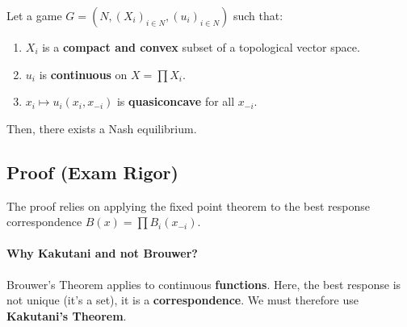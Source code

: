 \begin{theoreme}[Glicksberg]
Let a game $G = (N, (X_i)_{i \in N}, (u_i)_{i \in N})$ such that:
\begin{enumerate}
    \item $X_i$ is a \textbf{compact and convex} subset of a topological vector space.
    \item $u_i$ is \textbf{continuous} on $X = \prod X_i$.
    \item $x_i \mapsto u_i(x_i, x_{-i})$ is \textbf{quasiconcave} for all $x_{-i}$.
\end{enumerate}
Then, there exists a Nash equilibrium.
\end{theoreme}

\subsection{Proof (Exam Rigor)}
The proof relies on applying the fixed point theorem to the best response correspondence $B(x) = \prod B_i(x_{-i})$.

\paragraph{Why Kakutani and not Brouwer?}
Brouwer's Theorem applies to continuous \textbf{functions}. Here, the best response is not unique (it's a set), it is a \textbf{correspondence}. We must therefore use \textbf{Kakutani's Theorem}.

